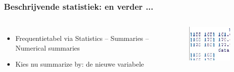 \documentclass{beamer}
\begin{document}
\begin{frame}
  \frametitle{Beschrijvende statistiek: en verder ...}
  \begin{columns}[c]
    \begin{itemize}
      \item Frequentietabel via Statistics -- Summaries -- Numerical summaries
      \item Kies nu summarize by: de nieuwe variabele
    \end{itemize}

    \begin{figure}
      \centering
      \includegraphics{img/oef3/freqtabel}
    \end{figure}
  \end{columns}
\end{frame}
\end{document}
